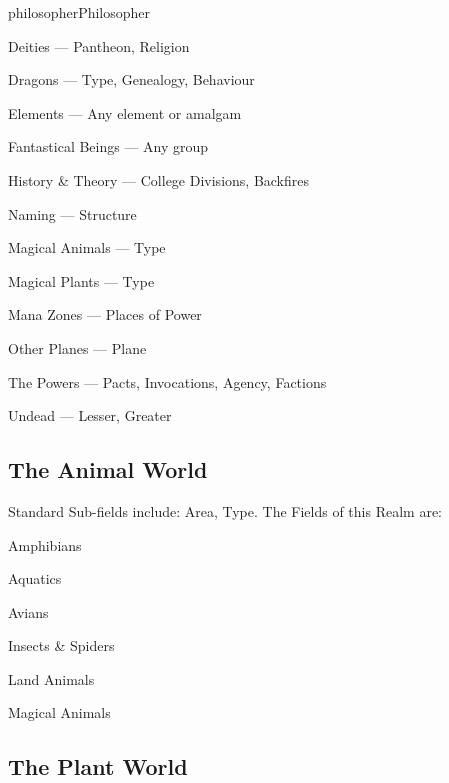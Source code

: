 \begin{Skill}[2.0]{philosopher}{Philosopher}
\begin{Itemize}
\item Deities — Pantheon, Religion  

\item Dragons — Type, Genealogy, Behaviour  

\item Elements — Any element or amalgam  

\item Fantastical Beings — Any group  

\item History \& Theory — College Divisions, Backfires

\item Naming — Structure  

\item Magical Animals — Type  

\item Magical Plants — Type  

\item Mana Zones — Places of Power  

\item Other Planes — Plane  

\item The Powers — Pacts, Invocations, Agency, Factions

\item Undead — Lesser, Greater 
\end{Itemize}

\subsection{The Animal World}

Standard Sub-fields include: Area, Type.  The Fields of this Realm
are:

\begin{Itemize}
\item Amphibians  

\item Aquatics  

\item Avians  

\item Insects \& Spiders  

\item Land Animals  

\item Magical Animals 
\end{Itemize}

\subsection{The Plant World}


\end{Skill}
